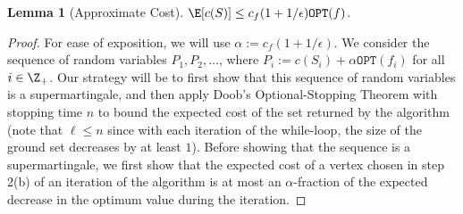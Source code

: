 \documentclass{article}
\newtheorem{lemma}{Lemma}[section]
\newcommand{\OPT}{\ensuremath{\mathtt{OPT}}\xspace}
\begin{document}
\begin{lemma}[Approximate Cost]\label{lem:bicriteria-random-deletion:expected-cost}
    $\E[c(S)] \leq c_f(1+1/\epsilon)\OPT(f)$.
\end{lemma}
\begin{proof}
    For ease of exposition, we will use $\alpha:= c_f(1+1/\epsilon)$.
    We consider the sequence of random variables $P_1, P_2, \ldots$, where $P_i := c(S_i) + \alpha\OPT(f_i)$ for all $i \in \Z_+$. Our strategy will be to first show that this sequence of random variables is a supermartingale, and then apply Doob's Optional-Stopping Theorem with stopping time $n$ to bound the expected cost of the set returned by the algorithm (note that $\ell \leq n$ since with each iteration of the while-loop, the size of the ground set decreases by at least $1$). Before showing that the sequence is a supermartingale, we first show that the expected cost of a vertex chosen in step 2(b) of an iteration of the algorithm is at most an $\alpha$-fraction of the expected decrease in the optimum value during the iteration.


\end{proof}
\end{document}
